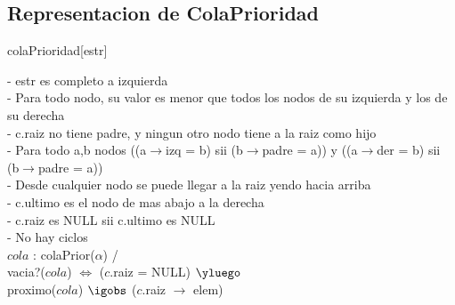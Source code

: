 \begin{Representacion}
\subsection{Representacion de ColaPrioridad}
 
\begin{Estructura}{colaPrioridad}[estr]
    \begin{Tupla}[estr]%
  \end{Tupla}
\end{Estructura}

\begin{Tupla}[nodo]
\end{Tupla}


	
- estr es completo a izquierda \\
- Para todo nodo, su valor es menor que todos los nodos de su izquierda y los de su derecha \\
- c.raiz no tiene padre, y ningun otro nodo tiene a la raiz como hijo \\
- Para todo a,b nodos  ((a$\to$izq = b) sii (b$\to$padre = a)) y ((a$\to$der = b) sii (b$\to$padre = a)) \\
- Desde cualquier nodo se puede llegar a la raiz yendo hacia arriba \\
- c.ultimo es el nodo de mas abajo a la derecha \\
- c.raiz es NULL sii c.ultimo es NULL \\
- No hay ciclos \\

%
{
$cola$ : colaPrior($\alpha$) / \\
	vacia?($cola$)  $\iff$  ($c$.raiz = NULL) $\yluego$ \\
	proximo($cola$) $\igobs$ ($c$.raiz $\to$ elem) \\
}%

\end{Representacion}

